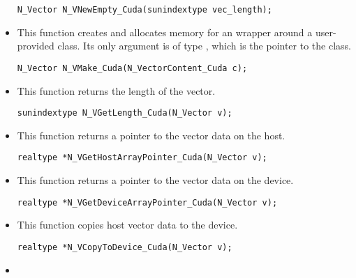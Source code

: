 \begin{itemize}
\begin{verbatim}
N_Vector N_VNewEmpty_Cuda(sunindextype vec_length);
\end{verbatim}



\item {}

  This function creates and allocates memory for an {\nveccuda}
  wrapper around a user-provided  class.
  Its only argument is of type , which
  is the pointer to the class.

\begin{verbatim}
N_Vector N_VMake_Cuda(N_VectorContent_Cuda c);
\end{verbatim}



\item {}

 This function returns the length of the vector.

 \verb|sunindextype N_VGetLength_Cuda(N_Vector v);|


\item {}

 This function returns a pointer to the vector data on the host.

 \verb|realtype *N_VGetHostArrayPointer_Cuda(N_Vector v);|



\item {}

 This function returns a pointer to the vector data on the device.

 \verb|realtype *N_VGetDeviceArrayPointer_Cuda(N_Vector v);|



\item {}

 This function copies host vector data to the device.

 \verb|realtype *N_VCopyToDevice_Cuda(N_Vector v);|



\item {}


\end{itemize}
